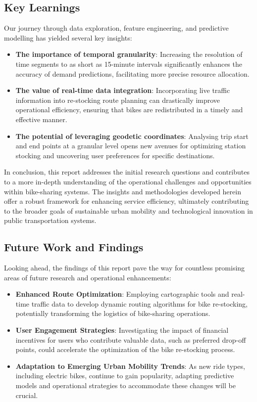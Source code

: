 \subsection{Key Learnings}\label{subsec:key-learnings}
Our journey through data exploration, feature engineering, and predictive modelling has yielded several key insights:\newline
\begin{itemize}
    \item  \textbf{The importance of temporal granularity}: Increasing the resolution of time segments to as short as 15-minute intervals significantly enhances the accuracy of demand predictions, facilitating more precise resource allocation.
    \item  \textbf{The value of real-time data integration}: Incorporating live traffic information into re-stocking route planning can drastically improve operational efficiency, ensuring that bikes are redistributed in a timely and effective manner.
    \item  \textbf{The potential of leveraging geodetic coordinates}: Analysing trip start and end points at a granular level opens new avenues for optimizing station stocking and uncovering user preferences for specific destinations.
\end{itemize}

In conclusion, this report addresses the initial research questions and contributes to a more in-depth understanding of the operational challenges and opportunities within bike-sharing systems.
The insights and methodologies developed herein offer a robust framework for enhancing service efficiency, ultimately contributing to the broader goals of sustainable urban mobility and technological innovation in public transportation systems.

\subsection{Future Work and Findings}\label{subsec:future-work}
Looking ahead, the findings of this report pave the way for countless promising areas of future research and operational enhancements:\newline
\begin{itemize}
    \item \textbf{Enhanced Route Optimization}: Employing cartographic tools and real-time traffic data to develop dynamic routing algorithms for bike re-stocking, potentially transforming the logistics of bike-sharing operations.
    \item  \textbf{User Engagement Strategies}: Investigating the impact of financial incentives for users who contribute valuable data, such as preferred drop-off points, could accelerate the optimization of the bike re-stocking process.
    \item  \textbf{Adaptation to Emerging Urban Mobility Trends}: As new ride types, including electric bikes, continue to gain popularity, adapting predictive models and operational strategies to accommodate these changes will be crucial.
\end{itemize}

